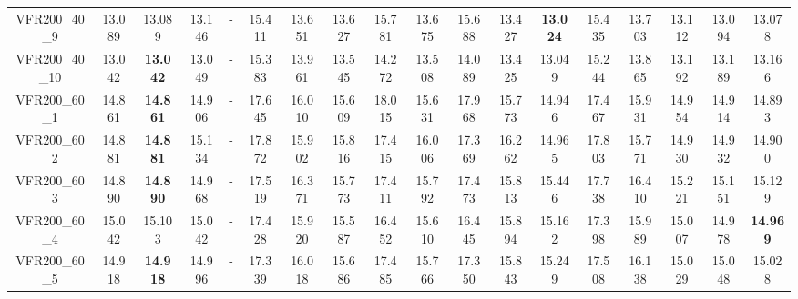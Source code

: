 \begin{tabular}{cc|ccc|ccccccccccccc}
VFR200\_40\_9      & 13.089           & 13.089           & 13.146           & -                & 15.411           & 13.651           & 13.627           & 15.781           & 13.675           & 15.688           & 13.427           & {\bf 13.024}     & 15.435           & 13.703           & 13.112           & 13.094           & 13.078          \\ 
VFR200\_40\_10     & 13.042           & {\bf 13.042}     & 13.049           & -                & 15.383           & 13.961           & 13.545           & 14.272           & 13.508           & 14.089           & 13.425           & 13.049           & 15.244           & 13.865           & 13.192           & 13.189           & 13.166          \\ 
VFR200\_60\_1      & 14.861           & {\bf 14.861}     & 14.906           & -                & 17.645           & 16.010           & 15.609           & 18.015           & 15.631           & 17.968           & 15.773           & 14.946           & 17.467           & 15.931           & 14.954           & 14.914           & 14.893          \\ 
VFR200\_60\_2      & 14.881           & {\bf 14.881}     & 15.134           & -                & 17.872           & 15.902           & 15.816           & 17.415           & 16.006           & 17.369           & 16.262           & 14.965           & 17.803           & 15.771           & 14.930           & 14.932           & 14.900          \\ 
VFR200\_60\_3      & 14.890           & {\bf 14.890}     & 14.968           & -                & 17.519           & 16.371           & 15.773           & 17.411           & 15.792           & 17.473           & 15.813           & 15.446           & 17.738           & 16.410           & 15.221           & 15.151           & 15.129          \\ 
VFR200\_60\_4      & 15.042           & 15.103           & 15.042           & -                & 17.428           & 15.920           & 15.587           & 16.452           & 15.610           & 16.445           & 15.894           & 15.162           & 17.398           & 15.989           & 15.007           & 14.978           & {\bf 14.969}    \\ 
VFR200\_60\_5      & 14.918           & {\bf 14.918}     & 14.996           & -                & 17.339           & 16.018           & 15.686           & 17.485           & 15.766           & 17.350           & 15.843           & 15.249           & 17.508           & 16.138           & 15.029           & 15.048           & 15.028          \\ 

\end{tabular}
